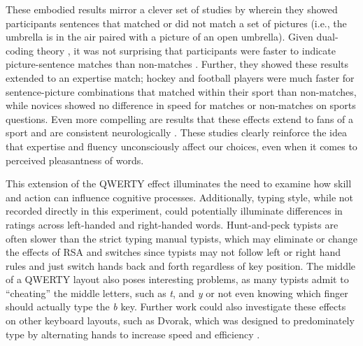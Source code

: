 \documentclass[english,man,man,mask]{apa6}
\theoremstyle{definition}
\theoremstyle{definition}
\theoremstyle{definition}
\theoremstyle{remark}
\begin{document}
These embodied results mirror a clever set of studies by
\textcite{Holt2006} wherein they showed participants sentences that
matched or did not match a set of pictures (i.e., the umbrella is in the
air paired with a picture of an open umbrella). Given dual-coding theory
\autocite{Paivio1991}, it was not surprising that participants were
faster to indicate picture-sentence matches than non-matches
\autocites[also see][]{Stanfield2001}{Zwaan2002}. Further, they showed
these results extended to an expertise match; hockey and football
players were much faster for sentence-picture combinations that matched
within their sport than non-matches, while novices showed no difference
in speed for matches or non-matches on sports questions. Even more
compelling are results that these effects extend to fans of a sport and
are consistent neurologically \autocite[i.e., motor cortex activation in
experts;][]{Beilock2008}. These studies clearly reinforce the idea that
expertise and fluency unconsciously affect our choices, even when it
comes to perceived pleasantness of words.

This extension of the QWERTY effect illuminates the need to examine how
skill and action can influence cognitive processes. Additionally, typing
style, while not recorded directly in this experiment, could potentially
illuminate differences in ratings across left-handed and right-handed
words. Hunt-and-peck typists are often slower than the strict typing
manual typists, which may eliminate or change the effects of RSA and
switches since typists may not follow left or right hand rules and just
switch hands back and forth regardless of key position. The middle of a
QWERTY layout also poses interesting problems, as many typists admit to
\enquote{cheating} the middle letters, such as \emph{t}, and \emph{y} or
not even knowing which finger should actually type the \emph{b} key.
Further work could also investigate these effects on other keyboard
layouts, such as Dvorak, which was designed to predominately type by
alternating hands to increase speed and efficiency \autocite{Noyes1983}.

\setlength{\parindent}{-0.5in} \setlength{\leftskip}{0.5in}

\printbibliography
\end{document}

